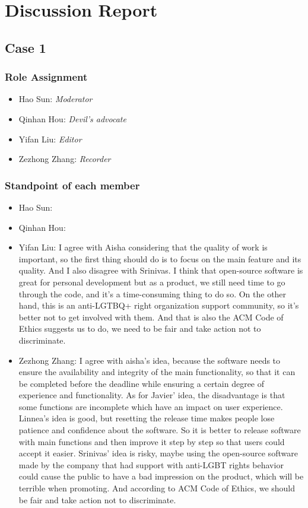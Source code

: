 \newpage
\section{Discussion Report}
	\subsection{Case 1}
		\subsubsection{Role Assignment}
		\begin{itemize}
  			\item Hao Sun: \emph{Moderator}
  			\item Qinhan Hou: \emph{Devil’s advocate}
  			\item Yifan Liu: \emph{Editor} 
  			\item Zezhong Zhang: \emph{Recorder}
		\end{itemize}
		\subsubsection{Standpoint of each member}
		\begin{itemize}
  			\item Hao Sun: 
  			\item Qinhan Hou:
  			\item Yifan Liu: I agree with Aisha considering that the quality of work is important, so the first thing should do is to focus on the main feature and its quality. And I also disagree with Srinivas. I think that open-source software is great for personal development but as a product, we still need time to go through the code, and it's a time-consuming thing to do so. On the other hand, this is an anti-LGTBQ+ right organization support community, so it's better not to get involved with them. 
  			And that is also the ACM Code of Ethics suggests us to do, we need to be fair and take action not to discriminate.
  			\item Zezhong Zhang: I agree with aisha's idea, because the software needs to ensure the availability and integrity of the main functionality, so that it can be completed before the deadline while ensuring a certain degree of experience and functionality. As for Javier' idea, the disadvantage is that some functions are incomplete which have an impact on user experience. Linnea's idea is good, but resetting the release time makes people lose patience and confidence about the software. So it is better to release software with main functions and then improve it step by step so that users could accept it easier. Srinivas' idea is risky, maybe using the open-source software made by the company that had support with anti-LGBT rights behavior could cause the public to have a bad impression on the product, which will be terrible when promoting. And according to ACM Code of Ethics, we should be fair and take action not to discriminate.
		\end{itemize}
